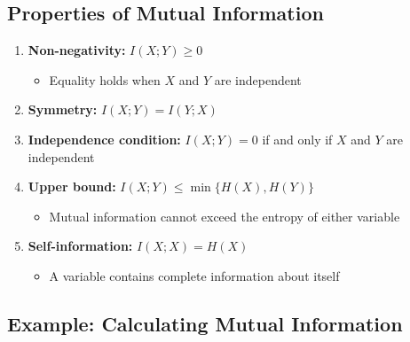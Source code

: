 \documentclass[11pt,a4paper]{book}
\begin{document}
\subsection{Properties of Mutual Information}
    \begin{enumerate}
        \item \textbf{Non-negativity:} \(I(X;Y) \geq 0\) 
        \begin{itemize}
            \item Equality holds when \(X\) and \(Y\) are independent
        \end{itemize}
        
        \item \textbf{Symmetry:} \(I(X;Y) = I(Y;X)\)
        
        \item \textbf{Independence condition:} \(I(X;Y) = 0\) if and only if \(X\) and \(Y\) are independent
        
        \item \textbf{Upper bound:} \(I(X;Y) \leq \min\{H(X), H(Y)\}\)
        \begin{itemize}
            \item Mutual information cannot exceed the entropy of either variable
        \end{itemize}
        
        \item \textbf{Self-information:} \(I(X;X) = H(X)\)
        \begin{itemize}
            \item A variable contains complete information about itself
        \end{itemize}
    \end{enumerate}

\subsection{Example: Calculating Mutual Information}
\end{document}
